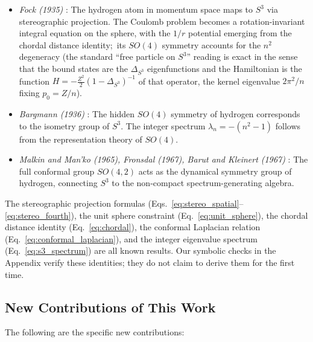 \documentclass[aps,pra,twocolumn,superscriptaddress,longbibliography]{revtex4-2}
\begin{document}
\begin{itemize}
\item \textit{Fock (1935)} \cite{fock1935}: The hydrogen atom in momentum space maps to $S^3$ via stereographic projection. The Coulomb problem becomes a rotation-invariant integral equation on the sphere, with the $1/r$ potential emerging from the chordal distance identity;\ its $SO(4)$ symmetry accounts for the $n^2$ degeneracy (the standard ``free particle on $S^3$'' reading is exact in the sense that the bound states are the $\Delta_{S^3}$ eigenfunctions and the Hamiltonian is the function $H = -\tfrac{Z^2}{2}(1-\Delta_{S^3})^{-1}$ of that operator, the kernel eigenvalue $2\pi^2/n$ fixing $p_0 = Z/n$).

\item \textit{Bargmann (1936)} \cite{bargmann1936}: The hidden $SO(4)$ symmetry of hydrogen corresponds to the isometry group of $S^3$. The integer spectrum $\lambda_n = -(n^2 - 1)$ follows from the representation theory of $SO(4)$.

\item \textit{Malkin and Man'ko (1965), Fronsdal (1967), Barut and Kleinert (1967)} \cite{malkin_manko1965,fronsdal1967,barut1967,barut1967b}: The full conformal group $SO(4,2)$ acts as the dynamical symmetry group of hydrogen, connecting $S^3$ to the non-compact spectrum-generating algebra.
\end{itemize}

The stereographic projection formulas (Eqs.~\ref{eq:stereo_spatial}--\ref{eq:stereo_fourth}), the unit sphere constraint (Eq.~\ref{eq:unit_sphere}), the chordal distance identity (Eq.~\ref{eq:chordal}), the conformal Laplacian relation (Eq.~\ref{eq:conformal_laplacian}), and the integer eigenvalue spectrum (Eq.~\ref{eq:s3_spectrum}) are all known results. Our symbolic checks in the Appendix verify these identities; they do not claim to derive them for the first time.

\subsection{New Contributions of This Work}

The following are the specific new contributions:
\end{document}
